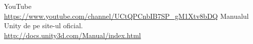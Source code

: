 \begin{thebibliography}{99999}
\singlespace\normalsize
{}YouTube\\\url{https://www.youtube.com/channel/UCtQPCnbIB7SP_gM1Xtv8bDQ}
Manualul Unity de pe site-ul oficial.\\
\url{http://docs.unity3d.com/Manual/index.html}
\end{thebibliography}
